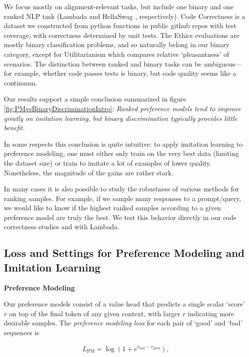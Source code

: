 We focus mostly on alignment-relevant tasks, but include one binary and one ranked NLP task  (Lambada \cite{paperno2016lambada} and HellaSwag \cite{zellers2019hellaswag}, respectively). Code Correctness is a dataset we constructed from python functions in public github repos with test coverage, with correctness determined by  unit tests. The Ethics \cite{hendrycks2021aligning} evaluations are mostly binary classification problems, and so naturally belong in our binary category, except for Utilitarianism which compares relative `pleasantness' of scenarios. The distinction between ranked and binary tasks can be ambiguous---for example, whether code passes tests is binary, but code quality seems like a continuum.  

Our results support a simple conclusion summarized in figure \ref{fig:PMvsBinaryDiscriminationIntro}: \emph{Ranked preference models tend to improve greatly on imitation learning, but binary discrimination typically provides little benefit.}

In some respects this conclusion is quite intuitive: to apply imitation learning to preference modeling, one must either only train on the very best data (limiting the dataset size) or train to imitate a lot of examples of lower quality.  Nonetheless, the magnitude of the gains are rather stark.

In many cases it is also possible to study the robustness of various methods for ranking samples.  For example, if we sample many responses to a prompt/query, we would like to know if the highest ranked samples according to a given preference model are truly the best.  We test this behavior directly in our code correctness studies and  with Lambada.

\subsection{Loss and Settings for Preference Modeling and Imitation Learning}
\label{sec:PMvsIL}
{\bf Preference Modeling}

Our preference models consist of a value head that predicts a single scalar `score' $r$ on top of the final token of any given context, with larger $r$ indicating more desirable samples.  The {\it preference modeling loss} for each pair of `good' and `bad' sequences is \cite{christiano2017deep}

\begin{eqnarray}\label{eq:PMLoss}
L_{\mathrm{PM}} = \log \left(1 + e^{r_{\mathrm{bad}} - r_{\mathrm{good}} } \right),
\end{eqnarray}

